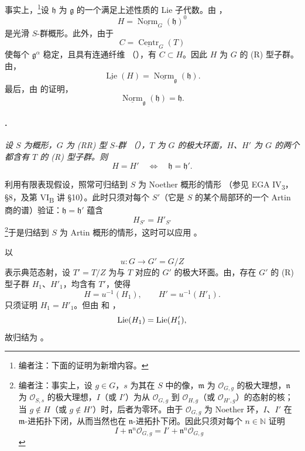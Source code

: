 事实上，\footnote{编者注：下面的证明为新增内容。}设 \(\mathfrak h\) 为 \(\mathfrak g\) 的一个满足上述性质的 Lie 子代数。由 ，
\[
  H=\underline{\operatorname{Norm}}_G(\mathfrak h)^0
\]
是光滑 \(S\)-群概形。此外，由于
\[
  C=\underline{\operatorname{Centr}}_G(T)
\]
使每个 \(\mathfrak g^\alpha\) 稳定，且具有连通纤维 \textup{（）}，有 \(C\subset H\)。因此 \(H\) 为 \(G\) 的 \textup{(R)} 型子群。由，
\[
  \underline{\operatorname{Lie}}(H)
  =
  \underline{\operatorname{Norm}}_{\mathfrak g}(\mathfrak h).
\]
最后，由  的证明，
\[
  \underline{\operatorname{Norm}}_{\mathfrak g}(\mathfrak h)
  =
  \mathfrak h.
\]

\paragraph{.}
\textit{设 \(S\) 为概形，\(G\) 为 \textup{(RR)} 型 \(S\)-群 \textup{（）}，\(T\) 为 \(G\) 的极大环面，\(H\)、\(H'\) 为 \(G\) 的两个都含有 \(T\) 的 \textup{(R)} 型子群。则}
\[
  H=H'
  \quad\Longleftrightarrow\quad
  \mathfrak h=\mathfrak h'.
\]

利用有限表现假设，照常可归结到 \(S\) 为 Noether 概形的情形 \textup{（参见 EGA IV\textsubscript{3}，\S8，及第 VI\textsubscript{B} 讲 \S10）}。此时只须对每个 \(S'\)（它是 \(S\) 的某个局部环的一个 Artin 商的谱）验证：\(\mathfrak h=\mathfrak h'\) 蕴含
\[
  H_{S'}=H'_{S'}
\]
\footnote{编者注：事实上，设 \(g\in G\)，\(s\) 为其在 \(S\) 中的像，\(\mathfrak m\) 为 \(\mathcal O_{G,g}\) 的极大理想，\(\mathfrak n\) 为 \(\mathcal O_{S,s}\) 的极大理想，\(I\)（或 \(I'\)）为从 \(\mathcal O_{G,g}\) 到 \(\mathcal O_{H,g}\)（或 \(\mathcal O_{H',g}\)）的态射的核；当 \(g\notin H\)（或 \(g\notin H'\)）时，后者为零环。由于 \(\mathcal O_{G,g}\) 为 Noether 环，\(I\)、\(I'\) 在 \(\mathfrak m\)-进拓扑下闭，从而当然也在 \(\mathfrak n\)-进拓扑下闭。因此只须对每个 \(n\in\mathbb N\) 证明
\[
  I+\mathfrak n^n\mathcal O_{G,g}
  =
  I'+\mathfrak n^n\mathcal O_{G,g}
\]
}于是归结到 \(S\) 为 Artin 概形的情形，这时可以应用 。

以
\[
  u:G\longrightarrow G'=G/Z
\]
表示典范态射，设 \(T'=T/Z\) 为与 \(T\) 对应的 \(G'\) 的极大环面。由，存在 \(G'\) 的 \textup{(R)} 型子群 \(H_1\)、\(H'_1\)，均含有 \(T'\)，使得
\[
  H=u^{-1}(H_1),
  \qquad
  H'=u^{-1}(H'_1).
\]
只须证明 \(H_1=H'_1\)。但由  和 ，
\[
  \operatorname{Lie}(H_1)=\operatorname{Lie}(H'_1),
\]
故归结为 。

